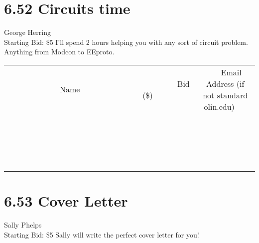 \documentclass[11pt]{article}
\begin{document}
\section*{6.52 Circuits time}
George Herring
\\
Starting Bid: \$5
\newline
I'll spend 2 hours helping you with any sort of circuit problem.  Anything from Modcon to EEproto.
\\[3ex]
\begin{tabular}{c c c}
~~~~~~~~~~~~~Name~~~~~~~~~~~~~ & ~~~~~~~~~Bid (\$)~~~~~~~~~  & ~~~Email Address (if not standard olin.edu)~~~\\
 & & \\
\hline
 & & \\
\hline
 & & \\
\hline
 & & \\
\hline
 & & \\
\hline
 & & \\
\hline
 & & \\
\hline
 & & \\
\hline
 & & \\
\hline
 & & \\
\hline
 & & \\
\hline
 & & \\
\hline
 & & \\
\hline
 & & \\
\hline
 & & \\
\hline
 & & \\
\hline
 & & \\
\hline
 & & \\
\hline
 & & \\
\hline
\end{tabular}
\newpage
\section*{6.53 Cover Letter}
Sally Phelps
\\
Starting Bid: \$5
\newline
Sally will write the perfect cover letter for you!
\end{document}
